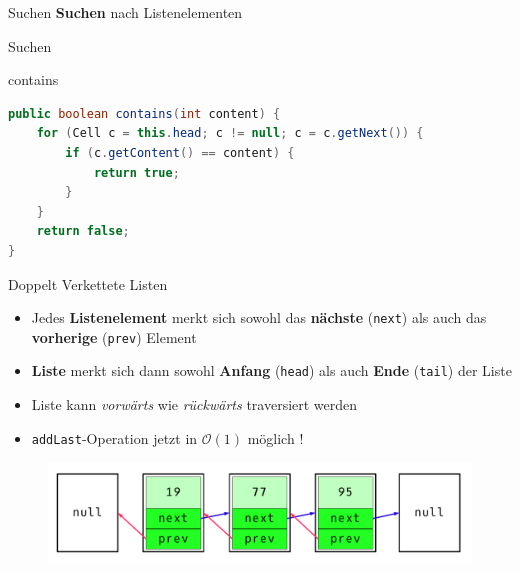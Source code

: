 \documentclass[18pt]{beamer}
\begin{document}
\begin{frame}{Suchen}
    \textbf{Suchen} nach Listenelementen
\end{frame}

\begin{frame}[fragile]{Suchen}
    \begin{exampleblock}{contains}
        \begin{lstlisting}[language=Java,basicstyle=\scriptsize]
public boolean contains(int content) {
    for (Cell c = this.head; c != null; c = c.getNext()) {
        if (c.getContent() == content) {
            return true;
        }
    }
    return false;
}
        \end{lstlisting}

    \end{exampleblock}

\end{frame}


\begin{frame}{Doppelt Verkettete Listen}
    \begin{itemize}
        \item Jedes \textbf{Listenelement} merkt sich sowohl das \textbf{nächste} (\texttt{next}) als auch das \textbf{vorherige} (\texttt{prev}) Element
        \item \textbf{Liste} merkt sich dann sowohl \textbf{Anfang} (\texttt{head}) als auch \textbf{Ende} (\texttt{tail}) der Liste
        \item Liste kann \textit{vorwärts} wie \textit{rückwärts} traversiert werden
        \item \texttt{addLast}-Operation jetzt in $\mathcal{O}(1)$ möglich !
    \end{itemize}

    \begin{figure}
        \includegraphics[scale=.3]{img/doublelinkedlist.png}
    \end{figure}
\end{frame}
\end{document}
